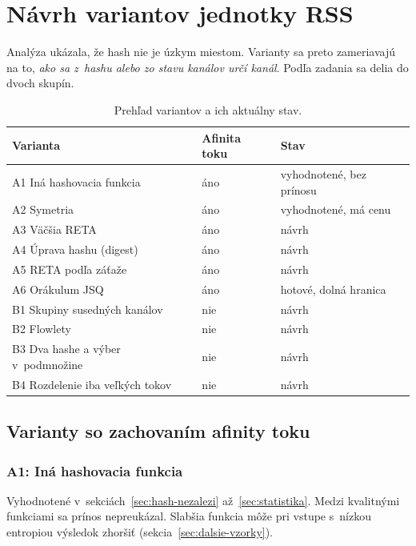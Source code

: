 \chapter{Návrh variantov jednotky RSS}
\label{chap:varianty}

Analýza ukázala, že hash nie je úzkym miestom. Varianty sa preto zameriavajú na to,
\emph{ako sa z~hashu alebo zo stavu kanálov určí kanál}. Podľa zadania sa delia do dvoch skupín.

\begin{table}[ht]
  \centering
  \small
  \caption{Prehľad variantov a ich aktuálny stav.}
  \label{tab:varianty}
  \begin{tabular}{l l l}
    \toprule
    Varianta & Afinita toku & Stav \\
    \midrule
    A1 Iná hashovacia funkcia     & áno & vyhodnotené, bez prínosu \\
    A2 Symetria                   & áno & vyhodnotené, má cenu \\
    A3 Väčšia RETA                & áno & návrh \\
    A4 Úprava hashu (digest)      & áno & návrh \\
    A5 RETA podľa záťaže          & áno & návrh \\
    A6 Orákulum JSQ               & áno & hotové, dolná hranica \\
    \midrule
    B1 Skupiny susedných kanálov  & nie & návrh \\
    B2 Flowlety                   & nie & návrh \\
    B3 Dva hashe a výber v~podmnožine & nie & návrh \\
    B4 Rozdelenie iba veľkých tokov & nie & návrh \\
    \bottomrule
  \end{tabular}
\end{table}

\section{Varianty so zachovaním afinity toku}

\subsection*{A1: Iná hashovacia funkcia}
Vyhodnotené v~sekciách~\ref{sec:hash-nezalezi} až~\ref{sec:statistika}. Medzi kvalitnými funkciami
sa prínos nepreukázal. Slabšia funkcia môže pri vstupe s~nízkou entropiou výsledok zhoršiť
(sekcia~\ref{sec:dalsie-vzorky}).

